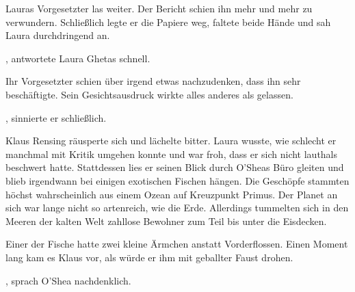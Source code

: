 Lauras Vorgesetzter las weiter. Der Bericht schien ihn mehr und mehr zu verwundern. Schließlich legte er die Papiere weg, faltete beide Hände und sah Laura durchdringend an.

\par


\par

, antwortete Laura Ghetas schnell.

\par

Ihr Vorgesetzter schien über irgend etwas nachzudenken, dass ihn sehr beschäftigte. Sein Gesichtsausdruck wirkte alles anderes als gelassen.

\par

, sinnierte er schließlich. 

\par

Klaus Rensing räusperte sich und lächelte bitter. Laura wusste, wie schlecht er manchmal mit Kritik umgehen konnte und war froh, dass er sich nicht lauthals beschwert hatte. Stattdessen lies er seinen Blick durch O’Sheas Büro gleiten und blieb irgendwann bei einigen exotischen Fischen hängen. Die Geschöpfe stammten höchst wahrscheinlich aus einem Ozean auf Kreuzpunkt Primus. Der Planet an sich war lange nicht so artenreich, wie die Erde. Allerdings tummelten sich in den Meeren der kalten Welt zahllose Bewohner zum Teil bis unter die Eisdecken.

\par

Einer der Fische hatte zwei kleine Ärmchen anstatt Vorderflossen. Einen Moment lang kam es Klaus vor, als würde er ihm mit geballter Faust drohen.

\par

, sprach O’Shea nachdenklich. 


